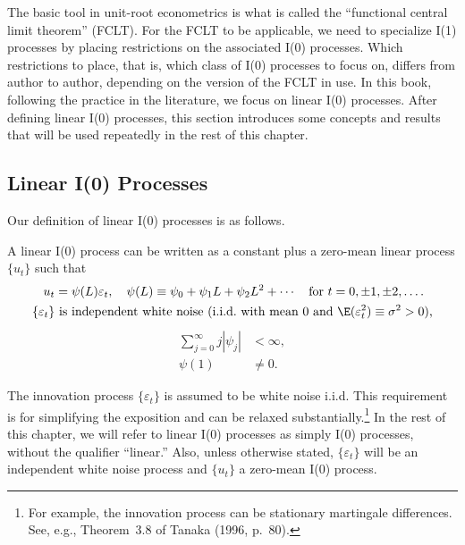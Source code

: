 
The basic tool in unit-root econometrics is what is called the ``functional central
limit theorem'' (FCLT). For the FCLT to be applicable, we need to specialize I(1)
processes by placing restrictions on the associated I(0) processes. Which restrictions to place, that is, which class of I(0) processes to focus on, differs from author
to author, depending on the version of the FCLT in use. In this book, following the
practice in the literature, we focus on linear I(0) processes. After defining linear
I(0) processes, this section introduces some concepts and results that will be used
repeatedly in the rest of this chapter.

\subsection*{Linear I(0) Processes}

Our definition of linear I(0) processes is as follows.

\begin{definition}
\label{def:9.2}
A linear I(0) process can be written as a
constant plus a zero-mean linear process $\{u_t\}$ such that
\begin{align}
u_t &= \psi(L)\varepsilon_t, \quad
\psi(L) \equiv \psi_0 + \psi_1 L + \psi_2 L^2 + \cdots
\quad \text{for } t = 0, \pm 1, \pm 2, \ldots.
\label{eq:9.2.1} \\
\{\varepsilon_t\} &\text{ is independent white noise (i.i.d.\ with mean 0 and }
\E(\varepsilon_t^2) \equiv \sigma^2 > 0\text{),}
\label{eq:9.2.2}
\end{align}
\begin{align}
\sum_{j=0}^{\infty} j|\psi_j| &< \infty,
\label{eq:9.2.3a}
\tag{9.2.3a} \\
\psi(1) &\neq 0.
\label{eq:9.2.3b}
\tag{9.2.3b}
\end{align}
\end{definition}

The innovation process $\{\varepsilon_t\}$ is assumed to be white noise i.i.d. This requirement is
for simplifying the exposition and can be relaxed substantially.\footnote{For
example, the innovation process can be stationary martingale differences. See,
e.g., Theorem~3.8 of Tanaka (1996, p.~80).} In the rest of this
chapter, we will refer to linear I(0) processes as simply I(0) processes, without the
qualifier ``linear.'' Also, unless otherwise stated, $\{\varepsilon_t\}$ will be an independent white
noise process and $\{u_t\}$ a zero-mean I(0) process.

